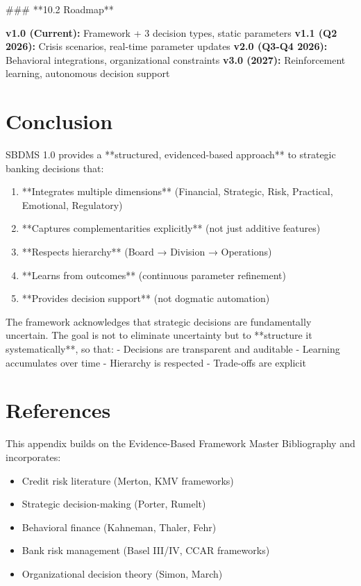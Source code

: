 \documentclass[11pt]{article}
\begin{document}
### **10.2 Roadmap**

\textbf{v1.0 (Current):} Framework + 3 decision types, static parameters
\textbf{v1.1 (Q2 2026):} Crisis scenarios, real-time parameter updates
\textbf{v2.0 (Q3-Q4 2026):} Behavioral integrations, organizational constraints
\textbf{v3.0 (2027):} Reinforcement learning, autonomous decision support

\section{Conclusion}

SBDMS 1.0 provides a **structured, evidenced-based approach** to strategic banking decisions that:

\begin{enumerate}
\item **Integrates multiple dimensions** (Financial, Strategic, Risk, Practical, Emotional, Regulatory)
\item **Captures complementarities explicitly** (not just additive features)
\item **Respects hierarchy** (Board → Division → Operations)
\item **Learns from outcomes** (continuous parameter refinement)
\item **Provides decision support** (not dogmatic automation)
\end{enumerate}

The framework acknowledges that strategic decisions are fundamentally uncertain. The goal is not to eliminate uncertainty but to **structure it systematically**, so that:
- Decisions are transparent and auditable
- Learning accumulates over time
- Hierarchy is respected
- Trade-offs are explicit

\section*{References}

\nocite{bcm_master}

This appendix builds on the Evidence-Based Framework Master Bibliography and incorporates:
\begin{itemize}
\item Credit risk literature (Merton, KMV frameworks)
\item Strategic decision-making (Porter, Rumelt)
\item Behavioral finance (Kahneman, Thaler, Fehr)
\item Bank risk management (Basel III/IV, CCAR frameworks)
\item Organizational decision theory (Simon, March)
\end{itemize}
\end{document}
